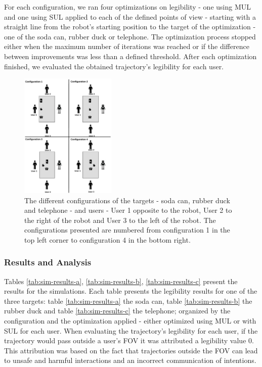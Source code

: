 \documentclass[letterpaper, 10 pt, conference]{ieeeconf}
\begin{document}
For each configuration, we ran four optimizations on legibility - one using \ac{MUL} and one using \ac{SUL} applied to each of the defined points of view - starting with a straight line from the robot's starting position to the target of the optimization - one of the soda can, rubber duck or telephone. The optimization process stopped either when the maximum number of iterations was reached or if the difference between improvements was less than a defined threshold. After each optimization finished, we evaluated the obtained trajectory's legibility for each user. 

\begin{figure}[t]
    \centering
    \includegraphics[width=.9\linewidth, height=6cm]{images/simulation_configurations.pdf}
    \caption{The different configurations of the targets - soda can, rubber duck and telephone - and users - User 1 opposite to the robot, User 2 to the right of the robot and User 3 to the left of the robot. The configurations presented are numbered from configuration 1 in the top left corner to configuration 4 in the bottom right.}
    \label{fig:simulation-configurations}
\end{figure}


\subsubsection{\textbf{Results and Analysis}}
Tables \ref{tab:sim-results-a}, \ref{tab:sim-results-b}, \ref{tab:sim-results-c} present the results for the simulations. Each table presents the legibility results for one of the three targets: table \ref{tab:sim-results-a} the soda can, table \ref{tab:sim-results-b} the rubber duck and table \ref{tab:sim-results-c} the telephone; organized by the configuration and the optimization applied - either optimized using \ac{MUL} or with \ac{SUL} for each user. When evaluating the trajectory's legibility for each user, if the trajectory would pass outside a user's \ac{FOV} it was attributed a legibility value 0. This attribution was based on the fact that trajectories outside the \ac{FOV} can lead to unsafe and harmful interactions and an incorrect communication of intentions.
\end{document}

